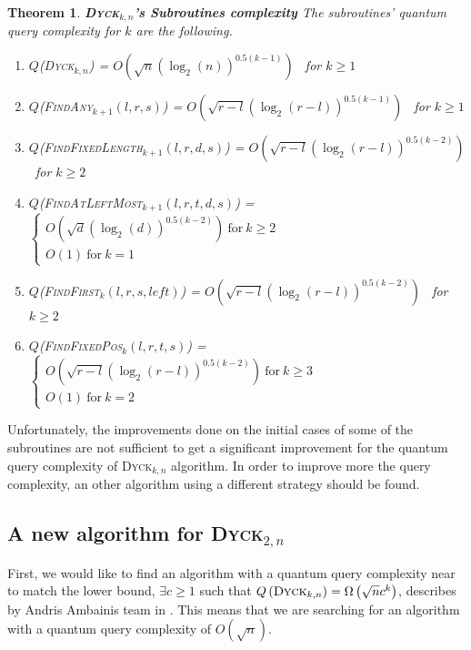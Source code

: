 \documentclass[11pt,a4paper]{article}
\newcommand{\Dyck}[1]{\textsc{Dyck$_{#1}$}}
\newcommand{\FA}[1]{\textsc{FindAny$_{#1}$}}
\newcommand{\FFL}[1]{\textsc{FindFixedLength$_{#1}$}}
\newcommand{\FFP}[1]{\textsc{FindFixedPos$_{#1}$}}
\newcommand{\FALM}[1]{\textsc{FindAtLeftMost$_{#1}$}}
\newcommand{\FF}[1]{\textsc{FindFirst$_{#1}$}}
\theoremstyle{definition}
\theoremstyle{plain}
\newtheorem{theorem}{Theorem}[section]
\theoremstyle{definition}
\begin{document}
\begin{theorem}{\textbf{\Dyck{k,n}'s Subroutines complexity}} \label{th:subroutine_complexity}
    The subroutines' quantum query complexity for $k$ are the following.
    \begin{enumerate}
        \item $Q$(\Dyck{k,n}) = $O\left(\sqrt{n}(\log_2(n))^{0.5(k-1)}\right)$ \ for $k \geq 1$
        \item $Q$(\FA{k+1}$(l,r,s)$) = $O\left(\sqrt{r-l}(\log_2(r-l))^{0.5(k-1)}\right)$ \ for $k \geq 1$
        \item $Q$(\FFL{k+1}$(l,r,d,s)$) = $O\left(\sqrt{r-l}(\log_2(r-l))^{0.5(k-2)}\right)$ \ for $k \geq 2$
        \item $Q$(\FALM{k+1}$(l, r, t, d, s)$) = $\left\{
                  \begin{array}{l}
                      O\left(\sqrt{d}(\log_2(d))^{0.5(k-2)}\right)\ \textrm{for} \ k \geq 2 \\
                      O(1)\ \textrm{for} \  k = 1
                  \end{array}
                  \right.$
        \item $Q$(\FF{k}$(l,r,s, left)$) = $O\left(\sqrt{r-l}(\log_2(r-l))^{0.5(k-2)}\right)$ \ for $k \geq 2$
        \item $Q$(\FFP{k}$(l,r,t,s)$) = $\left\{ \begin{array}{l}
                      O\left(\sqrt{r-l}(\log_2(r-l))^{0.5(k-2)}\right)\ \textrm{for} \ k \geq 3 \\
                      O(1) \ \textrm{for} \ k = 2
                  \end{array}
                  \right.$
    \end{enumerate}
\end{theorem}

Unfortunately, the improvements done on the initial cases of some of the subroutines are not sufficient
to get a significant improvement for the quantum query complexity of \Dyck{k,n} algorithm. In order to
improve more the query complexity, an other algorithm using a different strategy should be found.

\subsection{A new algorithm for \Dyck{2,n}}

First, we would like to find an algorithm with a quantum query complexity near to match the lower bound,
$\exists c \geq 1$ such that $Q\left(\Dyck{k,n}\right)=\Omega\left(\sqrt{n}c^k\right)$, describes by Andris
Ambainis team in \cite{art:2DGrid}. This means that we are searching for an algorithm with a quantum query
complexity of $O\left(\sqrt{n}\right)$.
\end{document}
